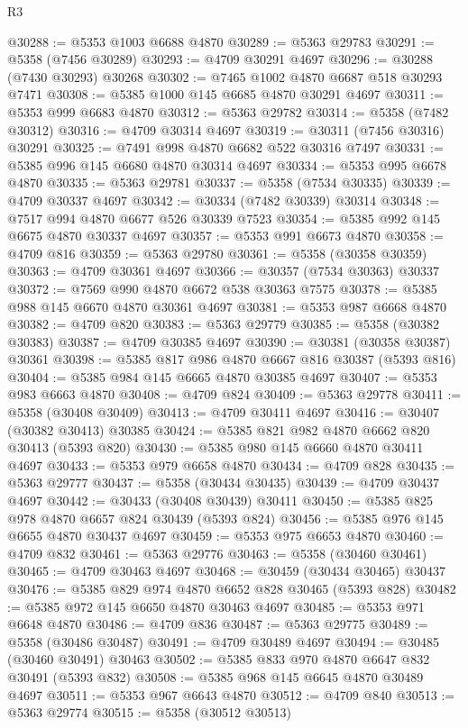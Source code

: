 \begin{lexlean}{R3}
\begin{coremodule}
@30288 := @5353 @1003 @6688 @4870
@30289 := @5363 @29783
@30291 := @5358 (@7456 @30289)
@30293 := @4709 @30291 @4697
@30296 := @30288 (@7430 @30293) @30268
@30302 := @7465 @1002 @4870 @6687 @518 @30293 @7471
@30308 := @5385 @1000 @145 @6685 @4870 @30291 @4697
@30311 := @5353 @999 @6683 @4870
@30312 := @5363 @29782
@30314 := @5358 (@7482 @30312)
@30316 := @4709 @30314 @4697
@30319 := @30311 (@7456 @30316) @30291
@30325 := @7491 @998 @4870 @6682 @522 @30316 @7497
@30331 := @5385 @996 @145 @6680 @4870 @30314 @4697
@30334 := @5353 @995 @6678 @4870
@30335 := @5363 @29781
@30337 := @5358 (@7534 @30335)
@30339 := @4709 @30337 @4697
@30342 := @30334 (@7482 @30339) @30314
@30348 := @7517 @994 @4870 @6677 @526 @30339 @7523
@30354 := @5385 @992 @145 @6675 @4870 @30337 @4697
@30357 := @5353 @991 @6673 @4870
@30358 := @4709 @816
@30359 := @5363 @29780
@30361 := @5358 (@30358 @30359)
@30363 := @4709 @30361 @4697
@30366 := @30357 (@7534 @30363) @30337
@30372 := @7569 @990 @4870 @6672 @538 @30363 @7575
@30378 := @5385 @988 @145 @6670 @4870 @30361 @4697
@30381 := @5353 @987 @6668 @4870
@30382 := @4709 @820
@30383 := @5363 @29779
@30385 := @5358 (@30382 @30383)
@30387 := @4709 @30385 @4697
@30390 := @30381 (@30358 @30387) @30361
@30398 := @5385 @817 @986 @4870 @6667 @816 @30387 (@5393 @816)
@30404 := @5385 @984 @145 @6665 @4870 @30385 @4697
@30407 := @5353 @983 @6663 @4870
@30408 := @4709 @824
@30409 := @5363 @29778
@30411 := @5358 (@30408 @30409)
@30413 := @4709 @30411 @4697
@30416 := @30407 (@30382 @30413) @30385
@30424 := @5385 @821 @982 @4870 @6662 @820 @30413 (@5393 @820)
@30430 := @5385 @980 @145 @6660 @4870 @30411 @4697
@30433 := @5353 @979 @6658 @4870
@30434 := @4709 @828
@30435 := @5363 @29777
@30437 := @5358 (@30434 @30435)
@30439 := @4709 @30437 @4697
@30442 := @30433 (@30408 @30439) @30411
@30450 := @5385 @825 @978 @4870 @6657 @824 @30439 (@5393 @824)
@30456 := @5385 @976 @145 @6655 @4870 @30437 @4697
@30459 := @5353 @975 @6653 @4870
@30460 := @4709 @832
@30461 := @5363 @29776
@30463 := @5358 (@30460 @30461)
@30465 := @4709 @30463 @4697
@30468 := @30459 (@30434 @30465) @30437
@30476 := @5385 @829 @974 @4870 @6652 @828 @30465 (@5393 @828)
@30482 := @5385 @972 @145 @6650 @4870 @30463 @4697
@30485 := @5353 @971 @6648 @4870
@30486 := @4709 @836
@30487 := @5363 @29775
@30489 := @5358 (@30486 @30487)
@30491 := @4709 @30489 @4697
@30494 := @30485 (@30460 @30491) @30463
@30502 := @5385 @833 @970 @4870 @6647 @832 @30491 (@5393 @832)
@30508 := @5385 @968 @145 @6645 @4870 @30489 @4697
@30511 := @5353 @967 @6643 @4870
@30512 := @4709 @840
@30513 := @5363 @29774
@30515 := @5358 (@30512 @30513)

\end{coremodule}
\end{lexlean}
